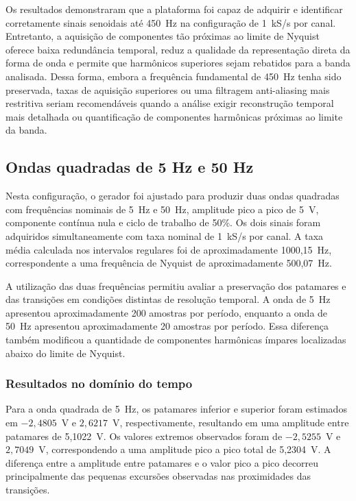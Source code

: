 \documentclass[a4paper,12pt]{fcte}
\begin{document}
Os resultados demonstraram que a plataforma foi capaz de adquirir e identificar corretamente sinais senoidais até 450~Hz na configuração de 1~kS/s por canal. Entretanto, a aquisição de componentes tão próximas ao limite de Nyquist oferece baixa redundância temporal, reduz a qualidade da representação direta da forma de onda e permite que harmônicos superiores sejam rebatidos para a banda analisada. Dessa forma, embora a frequência fundamental de 450~Hz tenha sido preservada, taxas de aquisição superiores ou uma filtragem anti-aliasing mais restritiva seriam recomendáveis quando a análise exigir reconstrução temporal mais detalhada ou quantificação de componentes harmônicas próximas ao limite da banda.

\subsection{Ondas quadradas de 5 Hz e 50 Hz}
\label{subsec:ondas_quadradas}

Nesta configuração, o gerador foi ajustado para produzir duas ondas quadradas com frequências nominais de 5~Hz e 50~Hz, amplitude pico a pico de 5~V, componente contínua nula e ciclo de trabalho de 50\%. Os dois sinais foram adquiridos simultaneamente com taxa nominal de 1~kS/s por canal. A taxa média calculada nos intervalos regulares foi de aproximadamente 1000,15~Hz, correspondente a uma frequência de Nyquist de aproximadamente 500,07~Hz.

A utilização das duas frequências permitiu avaliar a preservação dos patamares e das transições em condições distintas de resolução temporal. A onda de 5~Hz apresentou aproximadamente 200 amostras por período, enquanto a onda de 50~Hz apresentou aproximadamente 20 amostras por período. Essa diferença também modificou a quantidade de componentes harmônicas ímpares localizadas abaixo do limite de Nyquist.

\subsubsection{Resultados no domínio do tempo}
\label{subsubsec:quadradas_tempo}

Para a onda quadrada de 5~Hz, os patamares inferior e superior foram estimados em $-2,4805$~V e $2,6217$~V, respectivamente, resultando em uma amplitude entre patamares de 5,1022~V. Os valores extremos observados foram de $-2,5255$~V e $2,7049$~V, correspondendo a uma amplitude pico a pico total de 5,2304~V. A diferença entre a amplitude entre patamares e o valor pico a pico decorreu principalmente das pequenas excursões observadas nas proximidades das transições.
\end{document}
